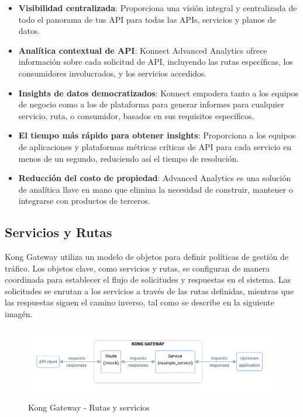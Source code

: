 \begin{itemize}
  \item \textbf{Visibilidad centralizada}: Proporciona una visión integral y centralizada de todo el panorama de tus API para todas las APIs, servicios y planos de datos.
  \item \textbf{Analítica contextual de API}: Konnect Advanced Analytics ofrece información sobre cada solicitud de API, incluyendo las rutas específicas, los consumidores involucrados, y los servicios accedidos.
  \item \textbf{Insights de datos democratizados}: Konnect empodera tanto a los equipos de negocio como a los de plataforma para generar informes para cualquier servicio, ruta, o consumidor, basados en sus requisitos específicos.
  \item \textbf{El tiempo más rápido para obtener insights}: Proporciona a los equipos de aplicaciones y plataformas métricas críticas de API para cada servicio en menos de un segundo, reduciendo así el tiempo de resolución.
  \item \textbf{Reducción del costo de propiedad}: Advanced Analytics es una solución de analítica llave en mano que elimina la necesidad de construir, mantener o integrarse con productos de terceros.
\end{itemize}

\subsection*{Servicios y Rutas}

Kong Gateway utiliza un modelo de objetos para definir políticas de gestión de tráfico. 
Los objetos clave, como servicios y rutas, se configuran de manera coordinada para establecer 
el flujo de solicitudes y respuestas en el sistema. Las solicitudes se enrutan a los servicios 
a través de las rutas definidas, mientras que las respuestas siguen el camino inverso, tal como se describe en 
la siguiente imagén. \cite{kong-services-routes}

\begin{figure}[h!]
  \centering
  \includegraphics[width=\columnwidth]{images/kong-gateway.png}
  \caption{Kong Gateway - Rutas y servicios}
  \label{fig:kong_gateway_rutas_servicios}
\end{figure}

